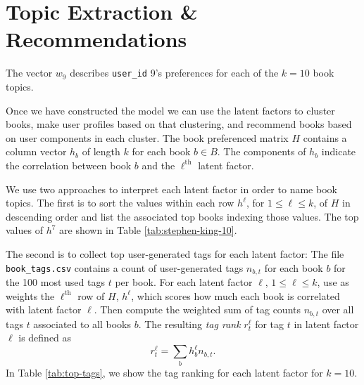 \documentclass[11pt]{article}
\begin{document}






\newpage

    \hypertarget{topic-extraction}{%
\section{Topic Extraction \& Recommendations}\label{topic-extraction}}


\begin{table}
\vspace{-10pt}
\centering
  
  \caption[User Profile]{The vector $w_9$ describes \texttt{user\_id} 9's preferences for each of the $k=10$ book topics.}
  \label{tab:user-profile-9}
  \vspace{-0pt}
\end{table}



Once we have constructed the model we can use the latent factors to cluster books, make user profiles based on that clustering,
and recommend books based on user components in each cluster.
The book preferenced matrix $H$ contains a column vector $h_b$ of length $k$ for each book $b \in B$.
The components of $h_b$ indicate the correlation between book $b$ and the $\ell^{\text{th}}$ latent factor.

We use two approaches to interpret each latent factor in order to name book topics.
The first is to sort the values within each row $h^\ell$, for $1 \leq \ell \leq k$, of $H$ in descending order and list the associated top books indexing those values.
The top values of $h^7$ are shown in Table \ref{tab:stephen-king-10}.

The second is to collect top user-generated tags for each latent factor:
The file \texttt{book\_tags.csv} contains a count of user-generated tags $n_{b,t}$ for each book $b$ for the 100 most used tags $t$ per book.
For each latent factor $\ell$, $1 \leq \ell \leq k$, use as weights the $\ell^{\text{th}}$ row of $H$, $h^\ell$,
which scores how much each book is correlated with latent factor $\ell$.
Then compute the weighted sum of tag counts $n_{b,t}$ over all tags $t$ associated to all books $b$.
The resulting \emph{tag rank} $r^\ell_t$ for tag $t$ in latent factor $\ell$ is defined as
\[r_t^\ell = \sum_{b} h^\ell_b n_{b,t}.\]
In Table \ref{tab:top-tags}, we show the tag ranking for each latent factor for $k=10$.
\end{document}
